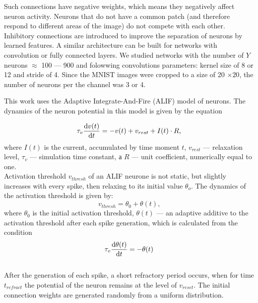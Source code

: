 \documentclass[a4paper]{article}
\begin{document}
Such connections have negative weights, which means they negatively affect neuron activity. Neurons that do not have a common patch (and therefore respond to different areas of the image) do not compete with each other. Inhibitory connections are introduced to improve the separation of neurons by learned features. A similar architecture can be built for networks with convolution or fully connected layers. We studied networks with the number of $Y$ neurons $\approx$ 100 --- 900 and folowwing convolutions parameters: kernel size of 8 or 12 and stride of 4. Since the MNIST images were cropped to a size of 20 $\times 20$, the number of neurons per the channel was 3 or 4.

This work uses the Adaptive Integrate-And-Fire (ALIF) model of neurons. The dynamics of the neuron potential in this model is given by the equation

\begin{equation} \label{eq:alif}
 \tau_v \dv{v(t)}{t} = -v(t) + v_{rest} + I(t) \cdot R \text{,}
\end{equation} where $I(t)$ is the current, accumulated by time moment $t$, $v_{rest}$ --- relaxation level, $\tau_v$ --- simulation time constant, а $R$ --- unit coefficient, numerically equal to one.\\ 

Activation threshold $v_{thresh}$ of an ALIF neurone is not static, but slightly increases with every spike, then relaxing to its initial value $\theta_o$. The dynamics of the activation threshold is given by:
\begin{equation} 
 v_{thresh} = \theta_0 + \theta(t) \text{,}
\end{equation} where $\theta_0$ is the initial activation threshold, $\theta(t)$ --- an adaptive additive to the activation threshold after each spike generation, which is calculated from the condition\\

\begin{equation}
 \tau_v \dv{\theta(t)}{t} = -\theta(t)
\end{equation}\\

After the generation of each spike, a short refractory period occurs, when for time $t_{refract}$ the potential of the neuron remains at the level of $v_{reset}$. The initial connection weights are generated randomly from a uniform distribution.
\end{document}
